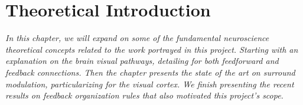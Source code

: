 
\chapter{Theoretical Introduction}
\label{cap:TheoreticalIntroduction}

\textit{In this chapter, we will expand on some of the fundamental neuroscience theoretical concepts related to the work portrayed in this project. Starting with an explanation on the brain visual pathways, detailing for both feedforward and feedback connections. Then the chapter presents the state of the art on surround modulation, particularizing for the visual cortex. We finish presenting the recent results on feedback organization rules that also motivated this project's scope.}

%

%
%

